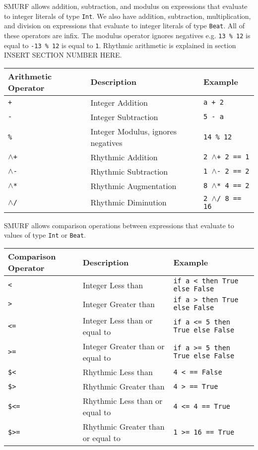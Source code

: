 SMURF allows addition, subtraction, and modulus on expressions that evaluate to integer literals of type \texttt{Int}. We also have addition, subtraction,
multiplication, and division on expressions that evaluate to integer literals of type \texttt{Beat}. All of these operators are infix.
The modulus operator ignores negatives e.g. \texttt{13 \% 12} is equal to \texttt{-13 \% 12} is equal to \texttt{1}. Rhythmic arithmetic is explained
in section INSERT SECTION NUMBER HERE.
\begin{table} [H]
\centering
\begin{tabularx}{\textwidth}{lXX}
\hline\hline
Arithmetic Operator & Description & Example \\
\hline\hline
  \texttt{+} & Integer Addition  & \texttt{a + 2} \\ \hline
  \texttt{-} & Integer Subtraction  & \texttt{5 - a} \\ \hline 
  \texttt{\%} & Integer Modulus, ignores negatives  & \texttt{14 \% 12} \\ \hline
  \texttt{$\wedge$+} & Rhythmic Addition & \texttt{2 $\wedge$+ 2 == 1} \\ \hline
  \texttt{$\wedge$-} & Rhythmic Subtraction & \texttt{1 $\wedge$- 2 == 2}  \\ \hline
  \texttt{$\wedge$*} & Rhythmic Augmentation & \texttt{8 $\wedge$* 4 == 2}  \\ \hline
  \texttt{$\wedge$/} & Rhythmic Diminution & \texttt{2 $\wedge$/ 8 == 16}  \\ \hline
\end{tabularx}
\end{table}

SMURF allows comparison operations between expressions that evaluate to values of type \texttt{Int} or \texttt{Beat}.
\begin{table} [H]
\centering
\begin{tabular}{lll}
\hline\hline
Comparison Operator & Description & Example \\
\hline\hline
  \texttt{<}  & Integer Less than & \texttt{if a \textless\space  5 then True else False} \\ \hline
  \texttt{>}  & Integer Greater than & \texttt{if a \textgreater\space  5 then True else False}  \\ \hline
  \texttt{<=}  & Integer Less than or equal to & \texttt{if a \textless= 5 then True else False} \\ \hline
  \texttt{>=} & Integer Greater than or equal to & \texttt{if a \textgreater= 5 then True else False} \\ \hline
  \texttt{\$<} & Rhythmic Less than & \texttt{4 \textless\space  8 == False} \\ \hline
  \texttt{\$>}  & Rhythmic Greater than &  \texttt{4 \textgreater\space  8 == True}  \\ \hline
  \texttt{\$<=} & Rhythmic Less than or equal to & \texttt{4 \textless= 4 == True} \\ \hline
  \texttt{\$>=} & Rhythmic Greater than or equal to &  \texttt{1 \textgreater= 16 == True} \\ \hline
\end{tabular}
\end{table}


